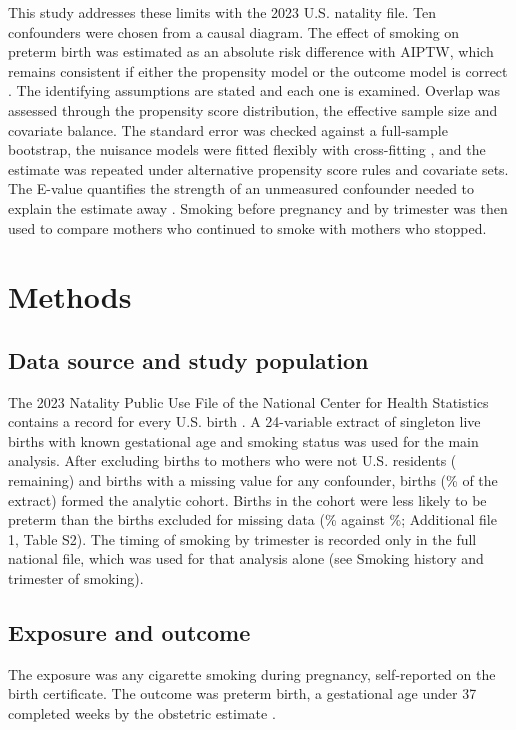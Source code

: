 \documentclass[11pt,letterpaper]{article}
\begin{document}
This study addresses these limits with the 2023 U.S. natality file. Ten confounders were chosen from a causal diagram. The effect of smoking on preterm birth was estimated as an absolute risk difference with AIPTW, which remains consistent if either the propensity model or the outcome model is correct \cite{bang2005}. The identifying assumptions are stated and each one is examined. Overlap was assessed through the propensity score distribution, the effective sample size and covariate balance. The standard error was checked against a full-sample bootstrap, the nuisance models were fitted flexibly with cross-fitting \cite{chern2018}, and the estimate was repeated under alternative propensity score rules and covariate sets. The E-value quantifies the strength of an unmeasured confounder needed to explain the estimate away \cite{vdw2017}. Smoking before pregnancy and by trimester was then used to compare mothers who continued to smoke with mothers who stopped.

\section*{Methods}

\subsection*{Data source and study population}
The 2023 Natality Public Use File of the National Center for Health Statistics contains a record for every U.S. birth \cite{nchs2024}. A 24-variable extract of \NExtract{} singleton live births with known gestational age and smoking status was used for the main analysis. After excluding births to mothers who were not U.S. residents (\NResident{} remaining) and births with a missing value for any confounder, \NTotal{} births (\PctKept{}\% of the extract) formed the analytic cohort. Births in the cohort were less likely to be preterm than the \NDropped{} births excluded for missing data (\KeptPreterm{}\% against \DroppedPreterm{}\%; Additional file 1, Table S2). The timing of smoking by trimester is recorded only in the full national file, which was used for that analysis alone (see Smoking history and trimester of smoking).

\subsection*{Exposure and outcome}
The exposure was any cigarette smoking during pregnancy, self-reported on the birth certificate. The outcome was preterm birth, a gestational age under 37 completed weeks by the obstetric estimate \cite{martin2015}.
\end{document}
